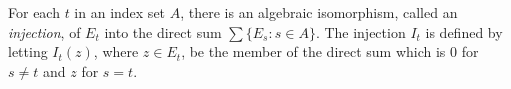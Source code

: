 For each $t$ in an index set $A$, there is an algebraic isomorphism, called an \textit{injection}, of $E_t$ into the direct sum $\sum \{E_s : s \in A\}$. The injection $I_t$ is defined by letting $I_t(z)$, where $z \in E_t$, be the member of the direct sum which is $0$ for $s \neq t$ and $z$ for $s = t$.
